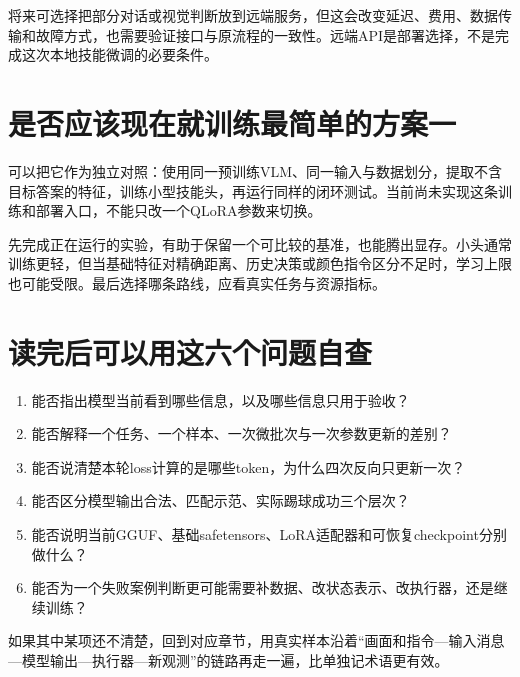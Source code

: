 将来可选择把部分对话或视觉判断放到远端服务，但这会改变延迟、费用、数据传输和故障方式，也需要验证接口与原流程的一致性。远端API是部署选择，不是完成这次本地技能微调的必要条件。

\section{是否应该现在就训练最简单的方案一}
可以把它作为独立对照：使用同一预训练VLM、同一输入与数据划分，提取不含目标答案的特征，训练小型技能头，再运行同样的闭环测试。当前尚未实现这条训练和部署入口，不能只改一个QLoRA参数来切换。

先完成正在运行的实验，有助于保留一个可比较的基准，也能腾出显存。小头通常训练更轻，但当基础特征对精确距离、历史决策或颜色指令区分不足时，学习上限也可能受限。最后选择哪条路线，应看真实任务与资源指标。

\section{读完后可以用这六个问题自查}
\begin{enumerate}
\item 能否指出模型当前看到哪些信息，以及哪些信息只用于验收？
\item 能否解释一个任务、一个样本、一次微批次与一次参数更新的差别？
\item 能否说清楚本轮loss计算的是哪些token，为什么四次反向只更新一次？
\item 能否区分模型输出合法、匹配示范、实际踢球成功三个层次？
\item 能否说明当前GGUF、基础safetensors、LoRA适配器和可恢复checkpoint分别做什么？
\item 能否为一个失败案例判断更可能需要补数据、改状态表示、改执行器，还是继续训练？
\end{enumerate}
如果其中某项还不清楚，回到对应章节，用真实样本沿着“画面和指令—输入消息—模型输出—执行器—新观测”的链路再走一遍，比单独记术语更有效。
